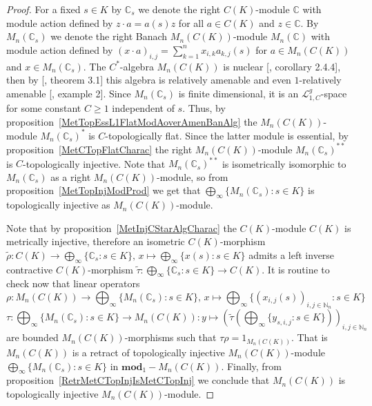 \begin{proof} For a fixed $s\in K$ by $\mathbb{C}_s$ we denote the right
$C(K)$-module $\mathbb{C}$ with module action defined by $z\cdot a=a(s)z$ for all
$a\in C(K)$ and $z\in\mathbb{C}$. By $M_n(\mathbb{C}_s)$ we denote the right
Banach $M_n(C(K))$-module $M_n(\mathbb{C})$ with module action defined by
${(x\cdot a)}_{i,j}=\sum_{k=1}^n x_{i,k}a_{k,j}(s)$ for $a\in M_n(C(K))$ and 
$x\in M_n(\mathbb{C}_s)$. The $C^*$-algebra $M_n(C(K))$ is nuclear
[\cite{BroOzaCStarAlgFinDimApprox}, corollary 2.4.4], then by
[\cite{HaaNucCStarAlgAmen}, theorem 3.1] this algebra is relatively amenable and
even $1$-relatively amenable [\cite{RundeAmenConstFour}, example 2]. Since
$M_n(\mathbb{C}_s)$ is finite dimensional, it is an $\mathscr{L}_{1, C}^g$-space
for some constant $C\geq 1$ independent of $s$. Thus, by
proposition~\ref{MetTopEssL1FlatModAoverAmenBanAlg} the $M_n(C(K))$-module
${M_n(\mathbb{C}_s)}^*$ is $C$-topologically flat. Since the latter module is
essential, by proposition~\ref{MetCTopFlatCharac} the right $M_n(C(K))$-module
${M_n(\mathbb{C}_s)}^{**}$ is $C$-topologically injective. Note that
${M_n(\mathbb{C}_s)}^{**}$ is isometrically isomorphic to $M_n(\mathbb{C}_s)$ as a 
right $M_n(C(K))$-module, so from proposition~\ref{MetTopInjModProd} we get that
$\bigoplus_\infty \{M_n(\mathbb{C}_s):s\in K \}$ is topologically injective as
$M_n(C(K))$-module.

Note that by proposition~\ref{MetInjCStarAlgCharac} the $C(K)$-module $C(K)$ is
metrically injective, therefore an isometric $C(K)$-morphism
$\widetilde{\rho}:
C(K)\to\bigoplus_\infty \{ \mathbb{C}_s:s\in K \},\, 
x\mapsto \bigoplus_\infty \{x(s):s\in K \}$ 
admits a left inverse contractive $C(K)$-morphism 
$\widetilde{\tau}:\bigoplus_\infty \{ \mathbb{C}_s:s\in K \} \to C(K)$. 
It is routine to check now that linear operators
$$
\rho:
M_n(C(K))\to\bigoplus\nolimits_\infty \{M_n(\mathbb{C}_s):s\in K \},\, 
x\mapsto \bigoplus\nolimits_\infty \{
    {(x_{i,j}(s))}_{i,j\in\mathbb{N}_n}:s\in K
 \}
$$
$$
\tau
:\bigoplus\nolimits_\infty \{M_n(\mathbb{C}_s):s\in K \}\to M_n(C(K))
:y\mapsto {\left(
    \widetilde{\tau}\left(\bigoplus\nolimits_\infty \{y_{s,i,j}:s\in K \}\right)
\right)}_{i,j\in\mathbb{N}_n}
$$
are bounded $M_n(C(K))$-morphisms such that $\tau \rho=1_{M_n(C(K))}$. That is
$M_n(C(K))$ is a retract of topologically injective $M_n(C(K))$-module
$\bigoplus_\infty \{M_n(\mathbb{C}_s):s\in K \}$ in $\mathbf{mod}_1-M_n(C(K))$.
Finally, from proposition~\ref{RetrMetCTopInjIsMetCTopInj} we conclude that
$M_n(C(K))$ is topologically injective $M_n(C(K))$-module.
\end{proof}

